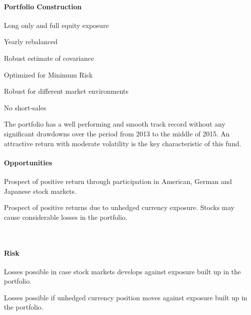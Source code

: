 \documentclass[11pt, parskip=full, DIV=14, headings=small, footsepline, footinclude=false, headsepline]{scrreprt}
\begin{document}
\begin{minipage}{0.5\textwidth}
\paragraph{Portfolio Construction}
\begin{sit}
\item Long only and full equity exposure
\item Yearly rebalanced
\item Robust estimate of covariance
\item Optimized for Minimum Risk
\item Robust for different market environments
\item No short-sales
\end{sit}
\end{minipage}
\begin{minipage}{0.5\textwidth}
\end{minipage}


The portfolio has a well performing and smooth track record without any significant drawdowns over the period from 2013 to the middle of 2015.
An attractive return with moderate volatility is the key characteristic of this fund.
 

\begin{minipage}[t]{0.49\textwidth}
  \paragraph{Opportunities}
  \begin{sit}
  \item Prospect of positive return through participation in American, German and Japanese stock markets.
  \item Prospect of positive returns due to unhedged currency exposure. Stocks may cause considerable losses in the portfolio.
  \end{sit}
\end{minipage}
~~
\begin{minipage}[t]{0.49\textwidth}
  \paragraph{Risk}
  \begin{sit}
  \item Losses possible in case stock markets develops against exposure built up in the portfolio.
  \item Losses possible if unhedged currency position moves against exposure built up in the portfolio.
  \end{sit}
\end{minipage}
\end{document}
